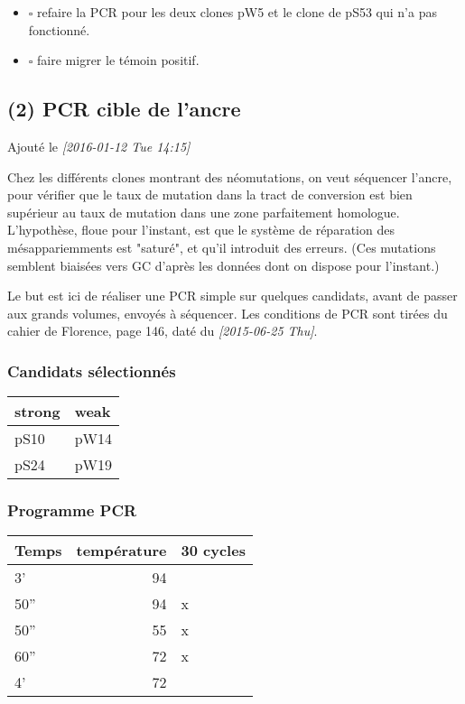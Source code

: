 \documentclass[9pt, oneside, twocolumn]{scrartcl}
\begin{document}
\begin{itemize}
\item $\square$ refaire la PCR pour les deux clones pW5 et le clone de pS53 qui n'a pas
fonctionné.
\item $\square$ faire migrer le témoin positif.
\end{itemize}

\subsection{(2) PCR cible de l'ancre}
\label{sec:orgheadline15}
Ajouté le \textit{[2016-01-12 Tue 14:15]}

Chez les différents clones montrant des néomutations, on veut séquencer l'ancre,
pour vérifier que le taux de mutation dans la tract de conversion est bien
supérieur au taux de mutation dans une zone parfaitement homologue. L'hypothèse,
floue pour l'instant, est que le système de réparation des mésappariemments est
"saturé", et qu'il introduit des erreurs. (Ces mutations semblent biaisées vers
GC d'après les données dont on dispose pour l'instant.)

Le but est ici de réaliser une PCR simple sur quelques candidats, avant de
passer aux grands volumes, envoyés à séquencer. Les conditions de PCR sont
tirées du cahier de Florence, page 146, daté du \textit{[2015-06-25 Thu]}. 

\subsubsection{Candidats sélectionnés}
\label{sec:orgheadline11}
\begin{center}
\begin{tabular}{ll}
\toprule
strong & weak\\
\midrule
pS10 & pW14\\
pS24 & pW19\\
\bottomrule
\end{tabular}
\end{center}

\subsubsection{Programme PCR}
\label{sec:orgheadline12}
\begin{center}
\begin{tabular}{lrl}
\toprule
Temps & température & 30 cycles\\
\midrule
3' & 94 & \\
50'' & 94 & x\\
50'' & 55 & x\\
60'' & 72 & x\\
4' & 72 & \\
\bottomrule
\end{tabular}
\end{center}
\end{document}
